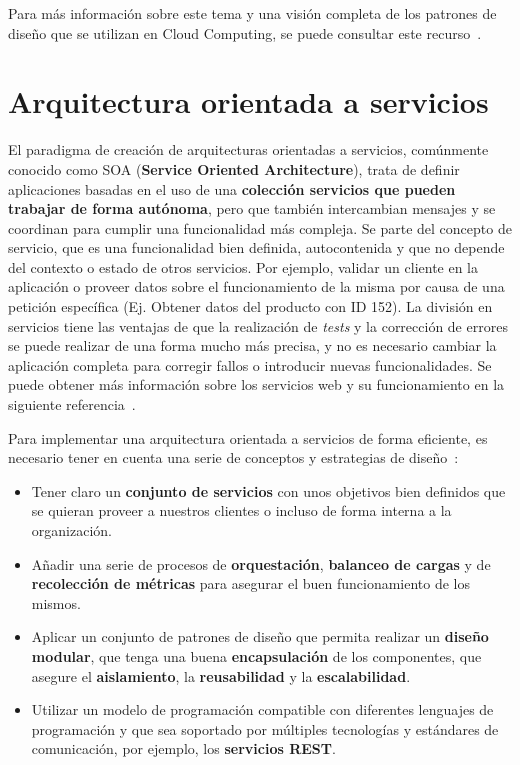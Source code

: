 Para más información sobre este tema y una visión completa de los patrones de diseño que se utilizan en Cloud Computing, se puede consultar este recurso~\cite{cloudpatts}.

\section{Arquitectura orientada a servicios}\label{sec:soa}
El paradigma de creación de arquitecturas orientadas a servicios, comúnmente conocido como SOA (\textbf{Service Oriented Architecture}), trata de definir aplicaciones basadas en el uso de una \textbf{colección servicios que pueden trabajar de forma autónoma}, pero que también intercambian mensajes y se coordinan para cumplir una funcionalidad más compleja. Se parte del concepto de servicio, que es una funcionalidad bien definida, autocontenida y que no depende del contexto o estado de otros servicios. Por ejemplo, validar un cliente en la aplicación o proveer datos sobre el funcionamiento de la misma por causa de una petición específica (Ej. Obtener datos del producto con ID 152). La división en servicios tiene las ventajas de que la realización de \textit{tests} y la corrección de errores se puede realizar de una forma mucho más precisa, y no es necesario cambiar la aplicación completa para corregir fallos o introducir nuevas funcionalidades. Se puede obtener más información sobre los servicios web y su funcionamiento en la siguiente referencia~\cite{wscom}.

Para implementar una arquitectura orientada a servicios de forma eficiente, es necesario tener en cuenta una serie de conceptos y estrategias de diseño~\cite{ibmsoa}:
\begin{itemize}
\item Tener claro un \textbf{conjunto de servicios} con unos objetivos bien definidos que se quieran proveer a nuestros clientes o incluso de forma interna a la organización.
\item Añadir una serie de procesos de \textbf{orquestación}, \textbf{balanceo de cargas} y de \textbf{recolección de métricas} para asegurar el buen funcionamiento de los mismos.
\item Aplicar un conjunto de patrones de diseño que permita realizar un \textbf{diseño modular}, que tenga una buena \textbf{encapsulación} de los componentes, que asegure el \textbf{aislamiento}, la \textbf{reusabilidad} y la \textbf{escalabilidad}.
\item Utilizar un modelo de programación compatible con diferentes lenguajes de programación y que sea soportado por múltiples tecnologías y estándares de comunicación, por ejemplo, los \textbf{servicios REST}.
\end{itemize}

